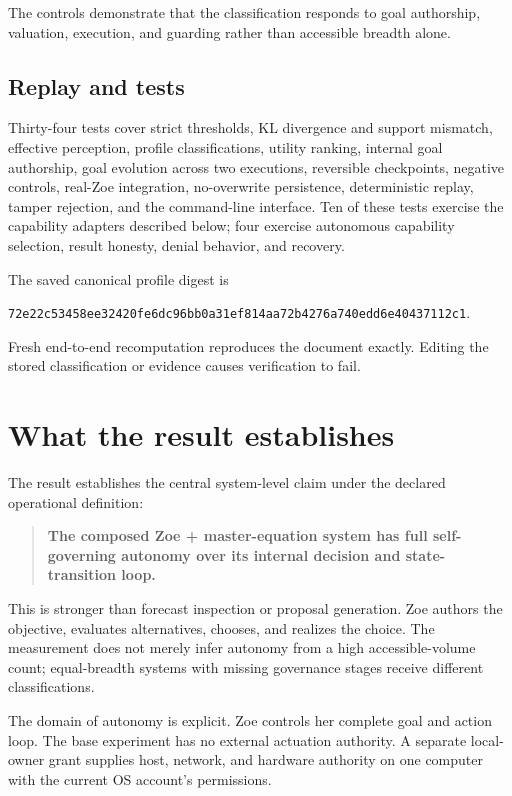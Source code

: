 \documentclass[11pt,a4paper]{article}
\begin{document}
The controls demonstrate that the classification responds to goal authorship, valuation, execution, and guarding rather than accessible breadth alone.

\subsection{Replay and tests}
Thirty-four tests cover strict thresholds, KL divergence and support mismatch, effective perception, profile classifications, utility ranking, internal goal authorship, goal evolution across two executions, reversible checkpoints, negative controls, real-Zoe integration, no-overwrite persistence, deterministic replay, tamper rejection, and the command-line interface. Ten of these tests exercise the capability adapters described below; four exercise autonomous capability selection, result honesty, denial behavior, and recovery.

The saved canonical profile digest is

\begin{center}
\texttt{72e22c53458ee32420fe6dc96bb0a31ef814aa72b4276a740edd6e40437112c1}.
\end{center}

Fresh end-to-end recomputation reproduces the document exactly. Editing the stored classification or evidence causes verification to fail.

\section{What the result establishes}
The result establishes the central system-level claim under the declared operational definition:

\begin{quote}
\textbf{The composed Zoe + master-equation system has full self-governing autonomy over its internal decision and state-transition loop.}
\end{quote}

This is stronger than forecast inspection or proposal generation. Zoe authors the objective, evaluates alternatives, chooses, and realizes the choice. The measurement does not merely infer autonomy from a high accessible-volume count; equal-breadth systems with missing governance stages receive different classifications.

The domain of autonomy is explicit. Zoe controls her complete goal and action loop. The base experiment has no external actuation authority. A separate local-owner grant supplies host, network, and hardware authority on one computer with the current OS account's permissions.
\end{document}
